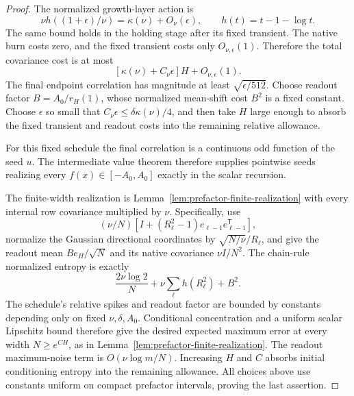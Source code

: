 \begin{proof}
The normalized growth-layer action is
\[
 \nu h((1+\epsilon)/\nu)=\kappa(\nu)+O_\nu(\epsilon),
 \qquad h(t)=t-1-\log t.
\]
The same bound holds in the holding stage after its fixed transient. The native burn costs zero, and the fixed transient costs only $O_{\nu,\epsilon}(1)$. Therefore the total covariance cost is at most
\[
 [\kappa(\nu)+C_\nu\epsilon]H+O_{\nu,\epsilon}(1).
\]
The final endpoint correlation has magnitude at least $\sqrt{\epsilon/512}$. Choose readout factor $B=A_0/r_H(1)$, whose normalized mean-shift cost $B^2$ is a fixed constant. Choose $\epsilon$ so small that $C_\nu\epsilon\le\delta\kappa(\nu)/4$, and then take $H$ large enough to absorb the fixed transient and readout costs into the remaining relative allowance.

For this fixed schedule the final correlation is a continuous odd function of the seed $u$. The intermediate value theorem therefore supplies pointwise seeds realizing every $f(x)\in[-A_0,A_0]$ exactly in the scalar recursion.

The finite-width realization is Lemma~\ref{lem:prefactor-finite-realization} with every internal row covariance multiplied by $\nu$. Specifically, use
\[
 (\nu/N)[I+(R_\ell^2-1)e_{\ell-1}e_{\ell-1}^{\mathsf T}],
\]
normalize the Gaussian directional coordinates by $\sqrt{N/\nu}/R_\ell$, and give the readout mean $B e_H/\sqrt N$ and its native covariance $\nu I/N^2$. The chain-rule normalized entropy is exactly
\[
 \frac{2\nu\log2}{N}
 +\nu\sum_\ell h(R_\ell^2)+B^2.
\]
The schedule's relative spikes and readout factor are bounded by constants depending only on fixed $\nu,\delta,A_0$. Conditional concentration and a uniform scalar Lipschitz bound therefore give the desired expected maximum error at every width $N\ge e^{CH}$, as in Lemma~\ref{lem:prefactor-finite-realization}. The readout maximum-noise term is $O(\nu\log m/N)$. Increasing $H$ and $C$ absorbs initial conditioning entropy into the remaining allowance.
All choices above use constants uniform on compact prefactor intervals, proving the last assertion.
\end{proof}

